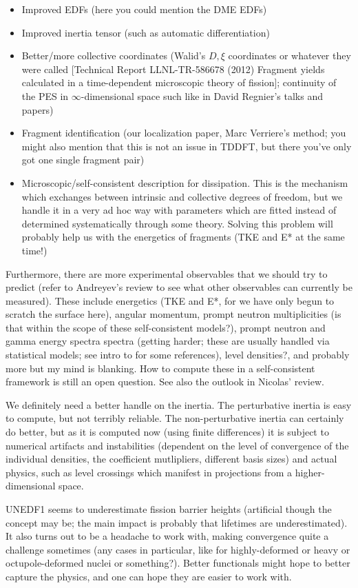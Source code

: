 \begin{itemize}
	\item Improved EDFs (here you could mention the DME EDFs)
	\item Improved inertia tensor (such as automatic differentiation)
	\item Better/more collective coordinates (Walid's $D, \xi$ coordinates or whatever they were called [Technical Report LLNL-TR-586678 (2012) Fragment yields calculated in a time-dependent microscopic theory of fission]; continuity of the PES in $\infty$-dimensional space such like in David Regnier's talks and papers)
	\item Fragment identification (our localization paper, Marc Verriere's method; you might also mention that this is not an issue in TDDFT, but there you've only got one single fragment pair)
	\item Microscopic/self-consistent description for dissipation. This is the mechanism which exchanges between intrinsic and collective degrees of freedom, but we handle it in a very ad hoc way with parameters which are fitted instead of determined systematically through some theory. Solving this problem will probably help us with the energetics of fragments (TKE and E* at the same time!)
\end{itemize}

Furthermore, there are more experimental observables that we should try to predict (refer to Andreyev's review to see what other observables can currently be measured). These include energetics (TKE and E*, for we have only begun to scratch the surface here), angular momentum, prompt neutron multiplicities (is that within the scope of these self-consistent models?), prompt neutron and gamma energy spectra spectra (getting harder; these are usually handled via statistical models; see intro to \cite{Schmidt2018} for some references), level densities?, and probably more but my mind is blanking. How to compute these in a self-consistent framework is still an open question. See also the outlook in Nicolas' review.

We definitely need a better handle on the inertia. The perturbative inertia is easy to compute, but not terribly reliable. The non-perturbative inertia can certainly do better, but as it is computed now (using finite differences) it is subject to numerical artifacts and instabilities (dependent on the level of convergence of the individual densities, the coefficient mutlipliers, different basis sizes) and actual physics, such as level crossings which manifest in projections from a higher-dimensional space.

UNEDF1 seems to underestimate fission barrier heights (artificial though the concept may be; the main impact is probably that lifetimes are underestimated). It also turns out to be a headache to work with, making convergence quite a challenge sometimes (any cases in particular, like for highly-deformed or heavy or octupole-deformed nuclei or something?). Better functionals might hope to better capture the physics, and one can hope they are easier to work with.